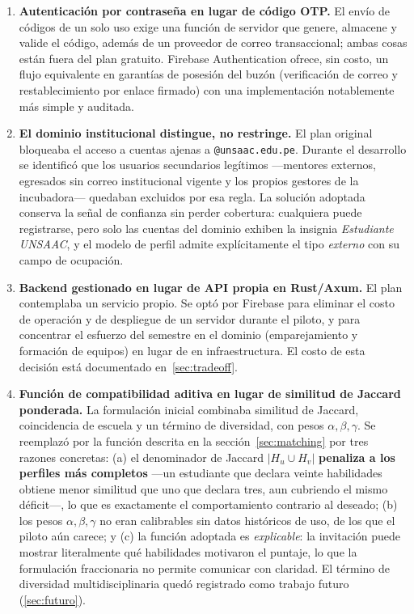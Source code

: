 \documentclass[12pt,a4paper]{article}
\begin{document}
\begin{enumerate}
    \item \textbf{Autenticación por contraseña en lugar de código OTP.} El envío de códigos de un solo uso exige una función de servidor que genere, almacene y valide el código, además de un proveedor de correo transaccional; ambas cosas están fuera del plan gratuito. Firebase Authentication ofrece, sin costo, un flujo equivalente en garantías de posesión del buzón (verificación de correo y restablecimiento por enlace firmado) con una implementación notablemente más simple y auditada.

    \item \textbf{El dominio institucional distingue, no restringe.} El plan original bloqueaba el acceso a cuentas ajenas a \texttt{@unsaac.edu.pe}. Durante el desarrollo se identificó que los usuarios secundarios legítimos ---mentores externos, egresados sin correo institucional vigente y los propios gestores de la incubadora--- quedaban excluidos por esa regla. La solución adoptada conserva la señal de confianza sin perder cobertura: cualquiera puede registrarse, pero solo las cuentas del dominio exhiben la insignia \emph{Estudiante UNSAAC}, y el modelo de perfil admite explícitamente el tipo \emph{externo} con su campo de ocupación.

    \item \textbf{Backend gestionado en lugar de API propia en Rust/Axum.} El plan contemplaba un servicio propio. Se optó por Firebase para eliminar el costo de operación y de despliegue de un servidor durante el piloto, y para concentrar el esfuerzo del semestre en el dominio (emparejamiento y formación de equipos) en lugar de en infraestructura. El costo de esta decisión está documentado en~\ref{sec:tradeoff}.

    \item \textbf{Función de compatibilidad aditiva en lugar de similitud de Jaccard ponderada.} La formulación inicial combinaba similitud de Jaccard, coincidencia de escuela y un término de diversidad, con pesos $\alpha, \beta, \gamma$. Se reemplazó por la función descrita en la sección~\ref{sec:matching} por tres razones concretas: (a) el denominador de Jaccard $|H_u \cup H_v|$ \textbf{penaliza a los perfiles más completos} ---un estudiante que declara veinte habilidades obtiene menor similitud que uno que declara tres, aun cubriendo el mismo déficit---, lo que es exactamente el comportamiento contrario al deseado; (b) los pesos $\alpha, \beta, \gamma$ no eran calibrables sin datos históricos de uso, de los que el piloto aún carece; y (c) la función adoptada es \emph{explicable}: la invitación puede mostrar literalmente qué habilidades motivaron el puntaje, lo que la formulación fraccionaria no permite comunicar con claridad. El término de diversidad multidisciplinaria quedó registrado como trabajo futuro (\ref{sec:futuro}).


\end{enumerate}
\end{document}
